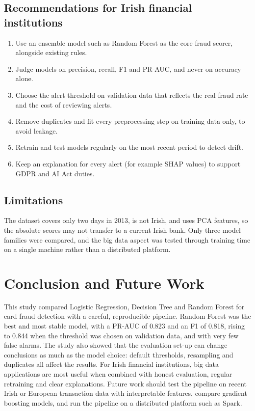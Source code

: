 \documentclass[12pt,a4paper]{article}
\begin{document}
\subsection{Recommendations for Irish financial institutions}
\begin{enumerate}[nosep]
\item Use an ensemble model such as Random Forest as the core fraud scorer, alongside existing rules.
\item Judge models on precision, recall, F1 and PR-AUC, and never on accuracy alone.
\item Choose the alert threshold on validation data that reflects the real fraud rate and the cost of reviewing alerts.
\item Remove duplicates and fit every preprocessing step on training data only, to avoid leakage.
\item Retrain and test models regularly on the most recent period to detect drift.
\item Keep an explanation for every alert (for example SHAP values) to support GDPR and AI Act duties.
\end{enumerate}

\subsection{Limitations}
The dataset covers only two days in 2013, is not Irish, and uses PCA features, so the absolute scores may not transfer to a current Irish bank. Only three model families were compared, and the big data aspect was tested through training time on a single machine rather than a distributed platform.

\section{Conclusion and Future Work}\label{sec:concl}
This study compared Logistic Regression, Decision Tree and Random Forest for card fraud detection with a careful, reproducible pipeline. Random Forest was the best and most stable model, with a PR-AUC of 0.823 and an F1 of 0.818, rising to 0.844 when the threshold was chosen on validation data, and with very few false alarms. The study also showed that the evaluation set-up can change conclusions as much as the model choice: default thresholds, resampling and duplicates all affect the results. For Irish financial institutions, big data applications are most useful when combined with honest evaluation, regular retraining and clear explanations. Future work should test the pipeline on recent Irish or European transaction data with interpretable features, compare gradient boosting models, and run the pipeline on a distributed platform such as Spark.
\end{document}
